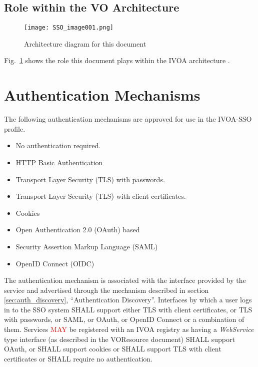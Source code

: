 \documentclass[11pt,a4paper]{ivoa}
\begin{document}

\subsection{Role within the VO Architecture}

\begin{figure}
\centering

\texttt{[image: SSO\_image001.png]}
\caption{Architecture diagram for this document}
\label{fig:archdiag}
\end{figure}

Fig.~\ref{fig:archdiag} shows the role this document plays within the
IVOA architecture \citep{2010ivoa.rept.1123A}.

\section{Authentication Mechanisms}
\label{sec:authentication-mechanisms}

The following authentication mechanisms are approved for use in 
the IVOA-SSO profile.
\begin{itemize}
\item No authentication required.
\item HTTP Basic Authentication
\item Transport Layer Security (TLS) with passwords.
\item Transport Layer Security (TLS) with client certificates.
\item Cookies
\item Open Authentication 2.0 (OAuth) based
\item Security Assertion Markup Language (SAML)
\item OpenID Connect (OIDC)
\end{itemize}

The authentication mechanism is associated with the interface provided 
by the service
and advertised through the mechanism described in 
section \ref{sec:auth_discovery}, ``Authentication Discovery''.
Interfaces by which a user logs in to the SSO system SHALL support
either
TLS with client certificates, or TLS with passwords, or SAML, 
or OAuth, or OpenID Connect or a combination of them.
Services \textcolor{red}{MAY} be registered with an IVOA registry 
as having a {\em WebService} type interface (as
described in the VOResource document) SHALL support OAuth, or SHALL
support cookies or SHALL support TLS with client
certificates or SHALL require no authentication.
\end{document}
